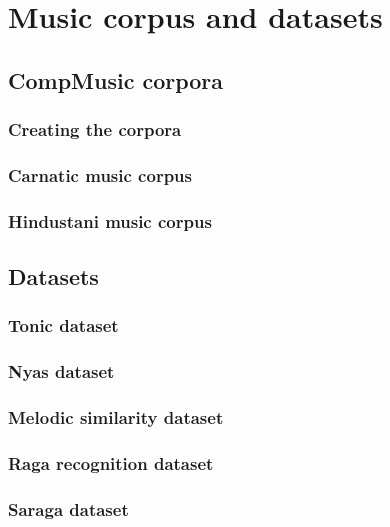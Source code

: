 
\chapter{Music corpus and datasets}\label{chap:datasets}

\section{CompMusic corpora}

\subsection{Creating the corpora}

\subsection{Carnatic music corpus}

\subsection{Hindustani music corpus}

\section{Datasets}

\subsection{Tonic dataset}

\subsection{Nyas dataset}

\subsection{Melodic similarity dataset}

\subsection{Raga recognition dataset}

\subsection{Saraga dataset}








